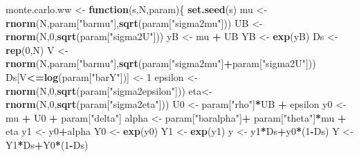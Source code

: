 \documentclass[]{book}
\newenvironment{Shaded}{\begin{snugshade}}{\end{snugshade}}
\newcommand{\ControlFlowTok}[1]{\textcolor[rgb]{0.13,0.29,0.53}{\textbf{#1}}}
\newcommand{\DecValTok}[1]{\textcolor[rgb]{0.00,0.00,0.81}{#1}}
\newcommand{\KeywordTok}[1]{\textcolor[rgb]{0.13,0.29,0.53}{\textbf{#1}}}
\newcommand{\NormalTok}[1]{#1}
\newcommand{\OperatorTok}[1]{\textcolor[rgb]{0.81,0.36,0.00}{\textbf{#1}}}
\newcommand{\StringTok}[1]{\textcolor[rgb]{0.31,0.60,0.02}{#1}}
\theoremstyle{definition}
\theoremstyle{definition}
\theoremstyle{definition}
\theoremstyle{remark}
\begin{document}
\begin{Shaded}
\begin{Highlighting}[]
\NormalTok{monte.carlo.ww <-}\StringTok{ }\ControlFlowTok{function}\NormalTok{(s,N,param)\{}
  \KeywordTok{set.seed}\NormalTok{(s)}
\NormalTok{  mu <-}\StringTok{ }\KeywordTok{rnorm}\NormalTok{(N,param[}\StringTok{"barmu"}\NormalTok{],}\KeywordTok{sqrt}\NormalTok{(param[}\StringTok{"sigma2mu"}\NormalTok{]))}
\NormalTok{  UB <-}\StringTok{ }\KeywordTok{rnorm}\NormalTok{(N,}\DecValTok{0}\NormalTok{,}\KeywordTok{sqrt}\NormalTok{(param[}\StringTok{"sigma2U"}\NormalTok{]))}
\NormalTok{  yB <-}\StringTok{ }\NormalTok{mu }\OperatorTok{+}\StringTok{ }\NormalTok{UB }
\NormalTok{  YB <-}\StringTok{ }\KeywordTok{exp}\NormalTok{(yB)}
\NormalTok{  Ds <-}\StringTok{ }\KeywordTok{rep}\NormalTok{(}\DecValTok{0}\NormalTok{,N)}
\NormalTok{  V <-}\StringTok{ }\KeywordTok{rnorm}\NormalTok{(N,param[}\StringTok{"barmu"}\NormalTok{],}\KeywordTok{sqrt}\NormalTok{(param[}\StringTok{"sigma2mu"}\NormalTok{]}\OperatorTok{+}\NormalTok{param[}\StringTok{"sigma2U"}\NormalTok{]))}
\NormalTok{  Ds[V}\OperatorTok{<=}\KeywordTok{log}\NormalTok{(param[}\StringTok{"barY"}\NormalTok{])] <-}\StringTok{ }\DecValTok{1} 
\NormalTok{  epsilon <-}\StringTok{ }\KeywordTok{rnorm}\NormalTok{(N,}\DecValTok{0}\NormalTok{,}\KeywordTok{sqrt}\NormalTok{(param[}\StringTok{"sigma2epsilon"}\NormalTok{]))}
\NormalTok{  eta<-}\StringTok{ }\KeywordTok{rnorm}\NormalTok{(N,}\DecValTok{0}\NormalTok{,}\KeywordTok{sqrt}\NormalTok{(param[}\StringTok{"sigma2eta"}\NormalTok{]))}
\NormalTok{  U0 <-}\StringTok{ }\NormalTok{param[}\StringTok{"rho"}\NormalTok{]}\OperatorTok{*}\NormalTok{UB }\OperatorTok{+}\StringTok{ }\NormalTok{epsilon}
\NormalTok{  y0 <-}\StringTok{ }\NormalTok{mu }\OperatorTok{+}\StringTok{  }\NormalTok{U0 }\OperatorTok{+}\StringTok{ }\NormalTok{param[}\StringTok{"delta"}\NormalTok{]}
\NormalTok{  alpha <-}\StringTok{ }\NormalTok{param[}\StringTok{"baralpha"}\NormalTok{]}\OperatorTok{+}\StringTok{  }\NormalTok{param[}\StringTok{"theta"}\NormalTok{]}\OperatorTok{*}\NormalTok{mu }\OperatorTok{+}\StringTok{ }\NormalTok{eta}
\NormalTok{  y1 <-}\StringTok{ }\NormalTok{y0}\OperatorTok{+}\NormalTok{alpha}
\NormalTok{  Y0 <-}\StringTok{ }\KeywordTok{exp}\NormalTok{(y0)}
\NormalTok{  Y1 <-}\StringTok{ }\KeywordTok{exp}\NormalTok{(y1)}
\NormalTok{  y <-}\StringTok{ }\NormalTok{y1}\OperatorTok{*}\NormalTok{Ds}\OperatorTok{+}\NormalTok{y0}\OperatorTok{*}\NormalTok{(}\DecValTok{1}\OperatorTok{-}\NormalTok{Ds)}
\NormalTok{  Y <-}\StringTok{ }\NormalTok{Y1}\OperatorTok{*}\NormalTok{Ds}\OperatorTok{+}\NormalTok{Y0}\OperatorTok{*}\NormalTok{(}\DecValTok{1}\OperatorTok{-}\NormalTok{Ds)}

\end{Highlighting}
\end{Shaded}
\end{document}
